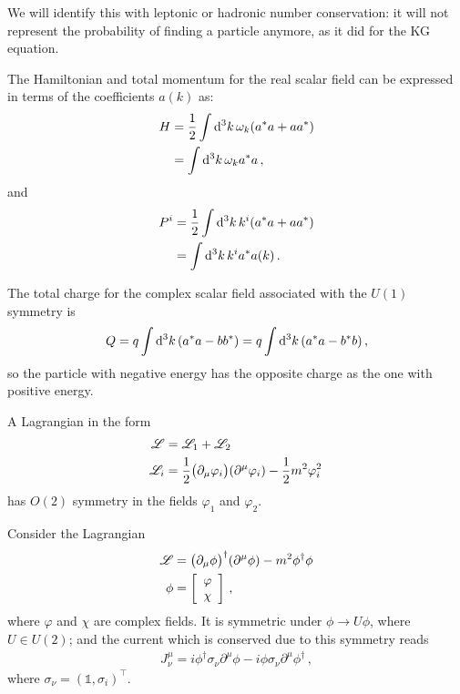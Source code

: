 \documentclass[main.tex]{subfiles}
\begin{document}
We will identify this with leptonic or hadronic number conservation: it will not represent the probability of finding a particle anymore, as it did for the KG equation. 

\begin{claim}
The Hamiltonian and total momentum for the real scalar field can be expressed in terms of the coefficients \(a(k)\) as: 
%
\begin{align}
H &=  \frac{1}{2} \int \dd[3]{k} \omega_{k}  \qty(a^{*}a + a a^{*})\\
&= \int \dd[3]{k} \omega_{k} a^{*} a
\,,
\end{align}
%
and 
%
\begin{align}
P^{i} &= \frac{1}{2} \int \dd[3]{k} k^{i}  \qty(a^{*}a + a a^{*})\\
&= \int \dd[3]{k} k^{i} a^{*} a(k) 
\,.
\end{align}
\end{claim}

\begin{claim}
The total charge for the complex scalar field associated with the \(U(1)\) symmetry is 
%
\begin{align}
Q = q\int \dd[3]{k} \qty(a^{*}a - bb^{*})
= q\int \dd[3]{k} \qty(a^{*}a - b^{*}b)
\,,
\end{align}
%
so the particle with negative energy has the opposite charge as the one with positive energy.
\end{claim}

\begin{claim}
A Lagrangian in the form 
%
\begin{align}
\mathscr{L} &= \mathscr{L}_{1} + \mathscr{L}_{2}  \\
\mathscr{L}_{i} &= \frac{1}{2} \qty(\partial_{\mu } \varphi_{i}) \qty(\partial^{\mu } \varphi_{i}) - \frac{1}{2} m^2 \varphi_{i}^2
\,
\end{align}
%
has \(O(2)\) symmetry in the fields \(\varphi_1 \) and \(\varphi_2 \).
\end{claim}

\begin{claim}
Consider the Lagrangian 
%
\begin{align}
\mathscr{L} &= \qty(\partial_{\mu } \phi )^\dag \qty(\partial^{\mu } \phi ) - m^2 \phi ^\dag \phi  \\
\phi &= \left[\begin{array}{c}
\varphi  \\ 
\chi 
\end{array}\right]
\,,
\end{align}
%
where \(\varphi \) and \(\chi \) are complex fields.
It is symmetric under \(\phi \to U\phi \), where \(U \in U(2)\); and the current which is conserved due to this symmetry reads 
%
\begin{align}
J^{\mu }_{\nu } = i \phi ^\dag \sigma_{\nu } \partial^{\mu } \phi - i \phi \sigma_{\nu } \partial^{\mu } \phi ^\dag
\,,
\end{align}
%
where \(\sigma_{\nu } = (\mathbb{1}, \sigma_{i})^{\top}\).
\end{claim}
\end{document}
